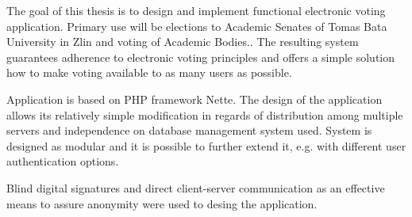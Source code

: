 The goal of this thesis is to design and implement functional electronic voting application. Primary use will be elections to Academic Senates of Tomas Bata University in Zlin  and voting of Academic Bodies.. The resulting system guarantees adherence to electronic voting principles and offers a simple solution how to make voting available to as many users as possible.

Application is based on PHP framework Nette. The design of the application allows its relatively simple modification in regards of distribution among multiple servers and independence on database management system used. System is designed as modular and it is possible to further extend it, e.g. with different user authentication options.

Blind digital signatures and direct client-server communication as an effective means to assure anonymity were used to desing the application.